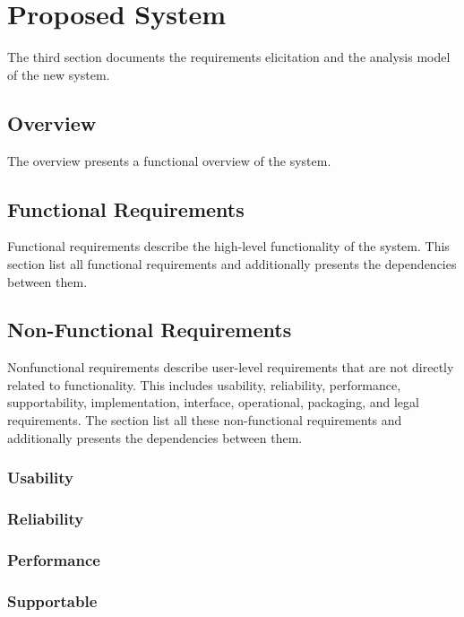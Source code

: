 \documentclass[a4paper,12pt]{scrartcl}
\newenvironment{subs}
{\adjustwidth{3em}{0pt}}
{\endadjustwidth}
\newenvironment{subsubs}
{\adjustwidth{2em}{0pt}}
{\endadjustwidth}
\begin{document}
    \section{Proposed System}
    The third section documents the requirements elicitation and the analysis model of the new system.
    \nopagebreak
    \begin{subs}
        \subsection{Overview}
        The overview presents a functional overview of the system.

        \subsection{Functional Requirements}
        Functional requirements describe the high-level functionality of the system. This section list all functional requirements and additionally presents the dependencies between them.

        \subsection{Non-Functional Requirements}
        Nonfunctional requirements describe user-level requirements that are not directly related to functionality. This includes usability, reliability, performance, supportability, implementation, interface, operational, packaging, and legal requirements. The section list all these non-functional requirements and additionally presents the dependencies between them.
        \begin{subsubs}
            \subsubsection{Usability}

            \subsubsection{Reliability}

            \subsubsection{Performance}

            \subsubsection{Supportable}


\end{subsubs}
\end{subs}
\end{document}
